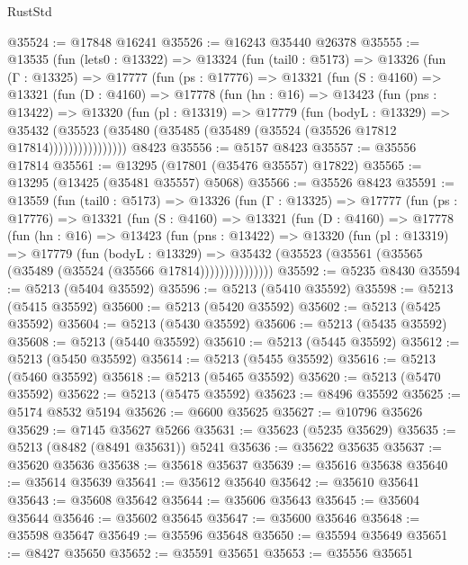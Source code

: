 \begin{lexlean}{RustStd}
\begin{coremodule}
@35524 := @17848 @16241
@35526 := @16243 @35440 @26378
@35555 := @13535
    (fun (lets0 : @13322) =>
    @13324
      (fun (tail0 : @5173) =>
      @13326
        (fun (Γ : @13325) =>
        @17777
          (fun (ps : @17776) =>
          @13321
            (fun (S : @4160) =>
            @13321
              (fun (D : @4160) =>
              @17778
                (fun (hn : @16) =>
                @13423
                  (fun (pns : @13422) =>
                  @13320
                    (fun (pl : @13319) =>
                    @17779
                      (fun (bodyL : @13329) =>
                      @35432
                        (@35523
                          (@35480 (@35485 (@35489 (@35524 (@35526 @17812 @17814))))))))))))))))
    @8423
@35556 := @5157 @8423
@35557 := @35556 @17814
@35561 := @13295 (@17801 (@35476 @35557) @17822)
@35565 := @13295 (@13425 (@35481 @35557) @5068)
@35566 := @35526 @8423
@35591 := @13559
    (fun (tail0 : @5173) =>
    @13326
      (fun (Γ : @13325) =>
      @17777
        (fun (ps : @17776) =>
        @13321
          (fun (S : @4160) =>
          @13321
            (fun (D : @4160) =>
            @17778
              (fun (hn : @16) =>
              @13423
                (fun (pns : @13422) =>
                @13320
                  (fun (pl : @13319) =>
                  @17779
                    (fun (bodyL : @13329) =>
                    @35432 (@35523 (@35561 (@35565 (@35489 (@35524 (@35566 @17814)))))))))))))))
@35592 := @5235 @8430
@35594 := @5213 (@5404 @35592)
@35596 := @5213 (@5410 @35592)
@35598 := @5213 (@5415 @35592)
@35600 := @5213 (@5420 @35592)
@35602 := @5213 (@5425 @35592)
@35604 := @5213 (@5430 @35592)
@35606 := @5213 (@5435 @35592)
@35608 := @5213 (@5440 @35592)
@35610 := @5213 (@5445 @35592)
@35612 := @5213 (@5450 @35592)
@35614 := @5213 (@5455 @35592)
@35616 := @5213 (@5460 @35592)
@35618 := @5213 (@5465 @35592)
@35620 := @5213 (@5470 @35592)
@35622 := @5213 (@5475 @35592)
@35623 := @8496 @35592
@35625 := @5174 @8532 @5194
@35626 := @6600 @35625
@35627 := @10796 @35626
@35629 := @7145 @35627 @5266
@35631 := @35623 (@5235 @35629)
@35635 := @5213 (@8482 (@8491 @35631)) @5241
@35636 := @35622 @35635
@35637 := @35620 @35636
@35638 := @35618 @35637
@35639 := @35616 @35638
@35640 := @35614 @35639
@35641 := @35612 @35640
@35642 := @35610 @35641
@35643 := @35608 @35642
@35644 := @35606 @35643
@35645 := @35604 @35644
@35646 := @35602 @35645
@35647 := @35600 @35646
@35648 := @35598 @35647
@35649 := @35596 @35648
@35650 := @35594 @35649
@35651 := @8427 @35650
@35652 := @35591 @35651
@35653 := @35556 @35651

\end{coremodule}
\end{lexlean}
